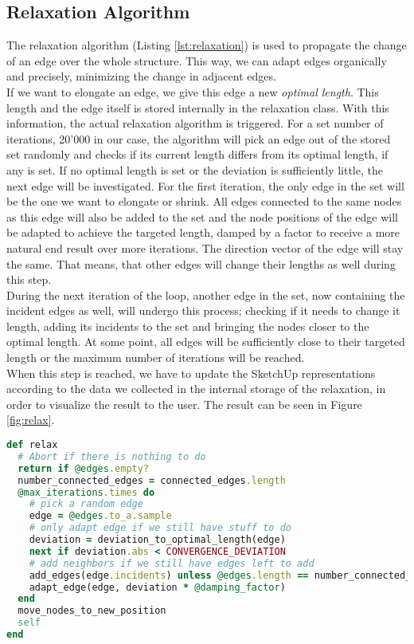 \subsection{Relaxation Algorithm}\label{sec:relaxation}
The relaxation algorithm (Listing \ref{lst:relaxation}) is used to propagate the change of an edge over the whole structure. This way, we can adapt edges organically and precisely, minimizing the change in adjacent edges.\\
If we want to elongate an edge, we give this edge a new \textit{optimal length}. This length and the edge itself is stored internally in the relaxation class. With this information, the actual relaxation algorithm is triggered. For a set number of iterations, 20'000 in our case, the algorithm will pick an edge out of the stored set randomly and checks if its current length differs from its optimal length, if any is set. If no optimal length is set or the deviation is sufficiently little, the next edge will be investigated. For the first iteration, the only edge in the set will be the one we want to elongate or shrink. All edges connected to the same nodes as this edge will also be added to the set and the node positions of the edge will be adapted to achieve the targeted length, damped by a factor to receive a more natural end result over more iterations. The direction vector of the edge will stay the same. That means, that other edges will change their lengths as well during this step.\\
During the next iteration of the loop, another edge in the set, now containing the incident edges as well, will undergo this process; checking if it needs to change it length, adding its incidents to the set and bringing the nodes closer to the optimal length. At some point, all edges will be sufficiently close to their targeted length or the maximum number of iterations will be reached.\\
When this step is reached, we have to update the SketchUp representations according to the data we collected in the internal storage of the relaxation, in order to visualize the result to the user. The result can be seen in Figure \ref{fig:relax}.

\begin{lstlisting}[language=Ruby, label={lst:relaxation}, caption=The relaxation algorithm]
def relax
  # Abort if there is nothing to do
  return if @edges.empty?
  number_connected_edges = connected_edges.length
  @max_iterations.times do
    # pick a random edge
    edge = @edges.to_a.sample
    # only adapt edge if we still have stuff to do
    deviation = deviation_to_optimal_length(edge)
    next if deviation.abs < CONVERGENCE_DEVIATION
    # add neighbors if we still have edges left to add
    add_edges(edge.incidents) unless @edges.length == number_connected_edges
    adapt_edge(edge, deviation * @damping_factor)
  end
  move_nodes_to_new_position
  self
end
\end{lstlisting}

